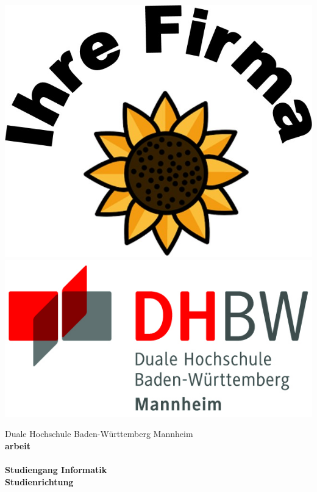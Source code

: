 \begin{titlepage}
    \begin{minipage}{\textwidth}
            \vspace{-2cm}
            \noindent \includegraphics[scale=0.25]{images/firmenlogo.jpg} \hfill \includegraphics{images/logo.jpg}
    \end{minipage}
    \vspace{1em}
    \begin{center}
        {\textsf{\large Duale Hochschule Baden-W\"urttemberg Mannheim}}\\[4em]
        {\textsf{\textbf{\large{\TheTypeOfWork}arbeit}}}\\[6mm]
        {\textsf{\textbf{\Large{}\TheTitle}}} \\[1.5cm]
        {\textsf{\textbf{\large{}Studiengang Informatik}}\\[6mm]
        \textsf{\textbf{Studienrichtung \TheFieldOfStudy}}}\vspace{10em}
        

\end{center}
\end{titlepage}
